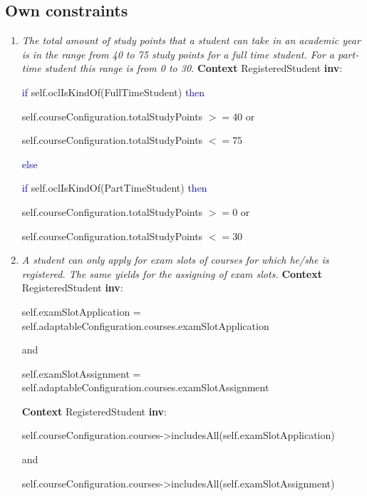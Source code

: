 \subsection{Own constraints}

\begin{enumerate}
	\item \emph{The total amount of study points that a student can take in an
	academic year is in the range from 40 to 75 study points for a full time
	student. For a part-time student this range is from 0 to 30.}
	\npar \textbf{Context} RegisteredStudent \textbf{inv}:
	\par \hspace*{5 mm} \textcolor{Blue}{if} self.oclIsKindOf(FullTimeStudent)
	\textcolor{Blue}{then}
	\par \hspace*{10 mm} self.courseConfiguration.totalStudyPoints $>= 40$ or
	\par \hspace*{10 mm} self.courseConfiguration.totalStudyPoints $<= 75$
	\par \hspace*{5 mm} \textcolor{Blue}{else}
	\par \hspace*{10 mm} \textcolor{Blue}{if} self.oclIsKindOf(PartTimeStudent)
	\textcolor{Blue}{then}
	\par \hspace*{15 mm} self.courseConfiguration.totalStudyPoints $>= 0$ or
	\par \hspace*{15 mm} self.courseConfiguration.totalStudyPoints $<= 30$
	
	\item \emph{A student can only apply for exam slots of
	courses for which he/she is registered. The same yields for the assigning of
	exam slots.}
	\npar \textbf{Context} RegisteredStudent \textbf{inv}:
	\par \hspace*{5 mm} self.examSlotApplication =
	self.adaptableConfiguration.courses.examSlotApplication
	\par \hspace*{5 mm} and
	\par \hspace*{5 mm} self.examSlotAssignment =
	self.adaptableConfiguration.courses.examSlotAssignment
	
	\npar \textbf{Context} RegisteredStudent \textbf{inv}:
	\par \hspace*{5 mm} self.courseConfiguration.courses->includesAll(self.examSlotApplication)
	\par \hspace*{5 mm} and
	\par \hspace*{5 mm} self.courseConfiguration.courses->includesAll(self.examSlotAssignment)
	

\end{enumerate}
